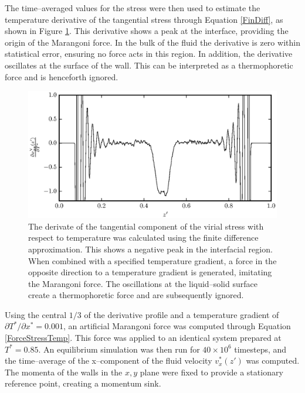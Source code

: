 The time--averaged values for the stress were then used to estimate the temperature derivative of the tangential stress through Equation \ref{FinDiff}, as shown in Figure \ref{PisVirForce}.
This derivative shows a peak at the interface, providing the origin of the Marangoni force.
In the bulk of the fluid the derivative is zero within statistical error, ensuring no force acts in this region.
In addition, the derivative oscillates at the surface of the wall.
This can be interpreted as a thermophoretic force and is henceforth ignored.

\begin{figure}[h!]
\centering
\includegraphics[scale=1.0]{PisVirForce}
\caption{The derivate of the tangential component of the virial stress with respect to temperature was calculated using the finite difference approximation.
This shows a negative peak in the interfacial region.
When combined with a specified temperature gradient, a force in the opposite direction to a temperature gradient is generated, imitating the Marangoni force.
The oscillations at the liquid--solid surface create a thermophoretic force and are subsequently ignored.}
\label{PisVirForce}
\end{figure}
\FloatBarrier

Using the central $1/3$ of the derivative profile and a temperature gradient of $\partial T^{*} / \partial x^{*} = 0.001$, an artificial Marangoni force was computed through Equation \ref{ForceStressTemp}.
This force was applied to an identical system prepared at $T^{*} = 0.85$.
An equilibrium simulation was then run for $40 \times 10^{6}$ timesteps, and the time--average of the x--component of the fluid velocity $v^{*}_{x}(z')$ was computed.
The momenta of the walls in the $x,y$ plane were fixed to provide a stationary reference point, creating a momentum sink.

